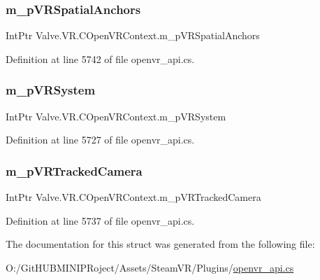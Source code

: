 \subsubsection{\texorpdfstring{m\_pVRSpatialAnchors}{m\_pVRSpatialAnchors}}
{\footnotesize\ttfamily Int\+Ptr Valve.\+V\+R.\+C\+Open\+V\+R\+Context.\+m\+\_\+p\+V\+R\+Spatial\+Anchors}



Definition at line 5742 of file openvr\+\_\+api.\+cs.

\mbox{\label{struct_valve_1_1_v_r_1_1_c_open_v_r_context_aad81a7fb9bda8ce3bf3763302cce3d16}} 
\subsubsection{\texorpdfstring{m\_pVRSystem}{m\_pVRSystem}}
{\footnotesize\ttfamily Int\+Ptr Valve.\+V\+R.\+C\+Open\+V\+R\+Context.\+m\+\_\+p\+V\+R\+System}



Definition at line 5727 of file openvr\+\_\+api.\+cs.

\mbox{\label{struct_valve_1_1_v_r_1_1_c_open_v_r_context_a4d808e37e6b59b3394def53dab61a17b}} 
\subsubsection{\texorpdfstring{m\_pVRTrackedCamera}{m\_pVRTrackedCamera}}
{\footnotesize\ttfamily Int\+Ptr Valve.\+V\+R.\+C\+Open\+V\+R\+Context.\+m\+\_\+p\+V\+R\+Tracked\+Camera}



Definition at line 5737 of file openvr\+\_\+api.\+cs.



The documentation for this struct was generated from the following file\+:\begin{DoxyCompactItemize}
\item 
O\+:/\+Git\+H\+U\+B\+M\+I\+N\+I\+P\+Roject/\+Assets/\+Steam\+V\+R/\+Plugins/\mbox{\hyperlink{openvr__api_8cs}{openvr\+\_\+api.\+cs}}\end{DoxyCompactItemize}
